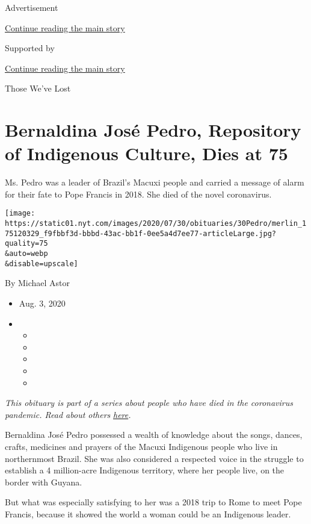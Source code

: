 Advertisement

\protect\hyperlink{after-top}{Continue reading the main story}

Supported by

\protect\hyperlink{after-sponsor}{Continue reading the main story}

Those We've Lost

\hypertarget{bernaldina-josuxe9-pedro-repository-of-indigenous-culture-dies-at-75}{%
\section{Bernaldina José Pedro, Repository of Indigenous Culture, Dies
at
75}\label{bernaldina-josuxe9-pedro-repository-of-indigenous-culture-dies-at-75}}

Ms. Pedro was a leader of Brazil's Macuxi people and carried a message
of alarm for their fate to Pope Francis in 2018. She died of the novel
coronavirus.

\texttt{[image: https://static01.nyt.com/images/2020/07/30/obituaries/30Pedro/merlin\_175120329\_f9fbbf3d-bbbd-43ac-bb1f-0ee5a4d7ee77-articleLarge.jpg?quality=75\\\&auto=webp\\\&disable=upscale]}

By Michael Astor

\begin{itemize}
\item
  Aug. 3, 2020
\item
  \begin{itemize}
  \item
  \item
  \item
  \item
  \item
  \end{itemize}
\end{itemize}

\emph{This obituary is part of a series about people who have died in
the coronavirus pandemic. Read about others}
\href{https://www.nytimes.com/interactive/2020/obituaries/people-died-coronavirus-obituaries.html}{\emph{here}}\emph{.}

Bernaldina José Pedro possessed a wealth of knowledge about the songs,
dances, crafts, medicines and prayers of the Macuxi Indigenous people
who live in northernmost Brazil. She was also considered a respected
voice in the struggle to establish a 4 million-acre Indigenous
territory, where her people live, on the border with Guyana.

But what was especially satisfying to her was a 2018 trip to Rome to
meet Pope Francis, because it showed the world a woman could be an
Indigenous leader.

